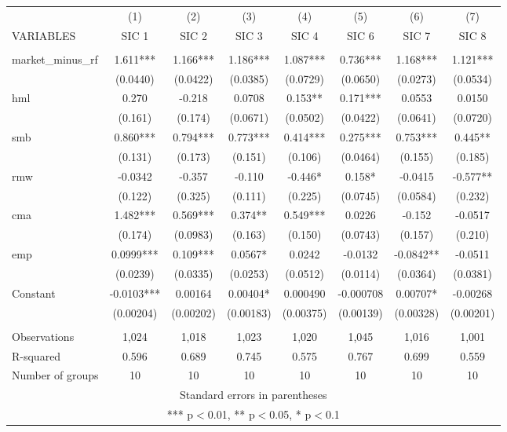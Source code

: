 \begin{tabular}{lccccccc} \hline
 & (1) & (2) & (3) & (4) & (5) & (6) & (7) \\
VARIABLES & SIC 1 & SIC 2 & SIC 3 & SIC 4 & SIC 6 & SIC 7 & SIC 8 \\ \hline
 &  &  &  &  &  &  &  \\
market\_minus\_rf & 1.611*** & 1.166*** & 1.186*** & 1.087*** & 0.736*** & 1.168*** & 1.121*** \\
 & (0.0440) & (0.0422) & (0.0385) & (0.0729) & (0.0650) & (0.0273) & (0.0534) \\
hml & 0.270 & -0.218 & 0.0708 & 0.153** & 0.171*** & 0.0553 & 0.0150 \\
 & (0.161) & (0.174) & (0.0671) & (0.0502) & (0.0422) & (0.0641) & (0.0720) \\
smb & 0.860*** & 0.794*** & 0.773*** & 0.414*** & 0.275*** & 0.753*** & 0.445** \\
 & (0.131) & (0.173) & (0.151) & (0.106) & (0.0464) & (0.155) & (0.185) \\
rmw & -0.0342 & -0.357 & -0.110 & -0.446* & 0.158* & -0.0415 & -0.577** \\
 & (0.122) & (0.325) & (0.111) & (0.225) & (0.0745) & (0.0584) & (0.232) \\
cma & 1.482*** & 0.569*** & 0.374** & 0.549*** & 0.0226 & -0.152 & -0.0517 \\
 & (0.174) & (0.0983) & (0.163) & (0.150) & (0.0743) & (0.157) & (0.210) \\
emp & 0.0999*** & 0.109*** & 0.0567* & 0.0242 & -0.0132 & -0.0842** & -0.0511 \\
 & (0.0239) & (0.0335) & (0.0253) & (0.0512) & (0.0114) & (0.0364) & (0.0381) \\
Constant & -0.0103*** & 0.00164 & 0.00404* & 0.000490 & -0.000708 & 0.00707* & -0.00268 \\
 & (0.00204) & (0.00202) & (0.00183) & (0.00375) & (0.00139) & (0.00328) & (0.00201) \\
 &  &  &  &  &  &  &  \\
Observations & 1,024 & 1,018 & 1,023 & 1,020 & 1,045 & 1,016 & 1,001 \\
R-squared & 0.596 & 0.689 & 0.745 & 0.575 & 0.767 & 0.699 & 0.559 \\
 Number of groups & 10 & 10 & 10 & 10 & 10 & 10 & 10 \\ \hline
\multicolumn{8}{c}{ Standard errors in parentheses} \\
\multicolumn{8}{c}{ *** p$<$0.01, ** p$<$0.05, * p$<$0.1} \\
\end{tabular}

